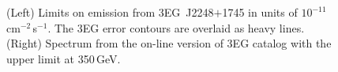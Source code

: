 \begin{figure}[b]
\caption{\label{FIG::OBSERVATIONS::J2248} (Left) Limits on 
emission from 3EG~J2248$+$1745 in units of
$10^{-11}$\,cm$^{-2}$\,s$^{-1}$. The 3EG error contours are overlaid
as heavy lines. (Right) Spectrum from the on-line version of 3EG
catalog with the upper limit at 350\,GeV.}
\end{figure}

